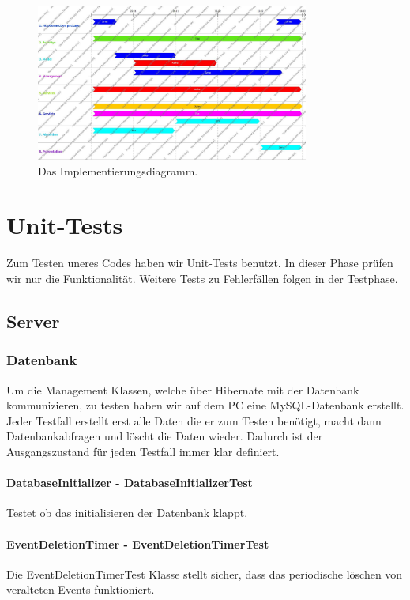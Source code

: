 \documentclass{scrartcl}
\begin{document}
	\begin{figure}[h]
		\centering
		\includegraphics[width=0.8\textwidth]{ImplementationDiagram.jpg}
		\caption{Das Implementierungsdiagramm.}
	\end{figure}
	
	\newpage
	\section{Unit-Tests}
	Zum Testen uneres Codes haben wir Unit-Tests benutzt. In dieser Phase prüfen wir nur die Funktionalität. Weitere Tests zu Fehlerfällen folgen in der Testphase.
	\subsection{Server}
	\subsubsection{Datenbank}
	Um die Management Klassen, welche über Hibernate mit der Datenbank kommunizieren, zu testen haben wir auf dem PC eine MySQL-Datenbank erstellt. Jeder Testfall erstellt erst alle Daten die er zum Testen benötigt, macht dann Datenbankabfragen und löscht die Daten wieder. Dadurch ist der Ausgangszustand für jeden Testfall immer klar definiert.
	\paragraph{DatabaseInitializer - DatabaseInitializerTest}	
	Testet ob das initialisieren der Datenbank klappt.
	\paragraph{EventDeletionTimer - EventDeletionTimerTest}	
	Die	EventDeletionTimerTest Klasse stellt sicher, dass das periodische löschen von veralteten Events funktioniert.
\end{document}
